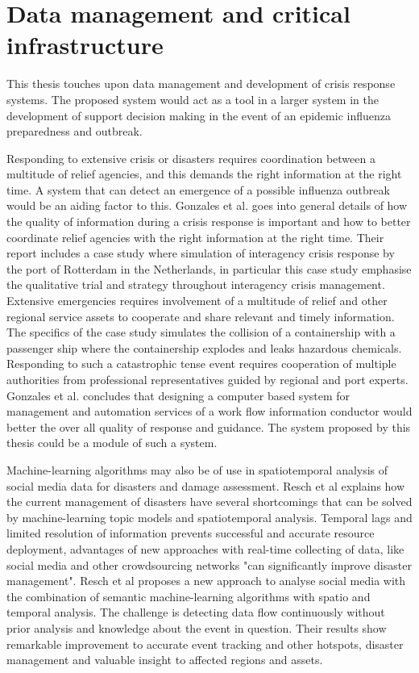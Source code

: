 \section{Data management and critical infrastructure}
This thesis touches upon data management and development of crisis response systems. The proposed system would act as a tool in a larger system in the development of support decision making in the event of an epidemic influenza preparedness and outbreak. 

Responding to extensive crisis or disasters requires coordination between a multitude of relief agencies, and this demands the right information at the right time. A system that can detect an emergence of a possible influenza outbreak would be an aiding factor to this. Gonzales et al. \cite{gonzalez2009framework} goes into general details of how the quality of information during a crisis response is important and how to better coordinate relief agencies with the right information at the right time. Their report includes a case study where simulation of interagency crisis response by the port of Rotterdam in the Netherlands, in particular this case study emphasise the qualitative trial and strategy throughout interagency crisis management. Extensive emergencies requires involvement of a multitude of relief and other regional service assets to cooperate and share relevant and timely information. The specifics of the case study simulates the collision of a containership with a passenger ship where the containership explodes and leaks hazardous chemicals. Responding to such a catastrophic tense event requires cooperation of multiple authorities from professional representatives guided by regional and port experts. Gonzales et al. concludes that designing a computer based system for management and automation services of a work flow information conductor would better the over all quality of response and guidance. The system proposed by this thesis could be a module of such a system. 

Machine-learning algorithms may also be of use in spatiotemporal analysis of social media data for disasters and damage assessment. Resch et al \cite{resch2018combining} explains how the current management of disasters have several shortcomings that can be solved by machine-learning topic models and spatiotemporal analysis. Temporal lags and limited resolution of information prevents successful and accurate resource deployment, advantages of new approaches with real-time collecting of data, like social media and other crowdsourcing networks "can significantly improve disaster management". Resch et al proposes a new approach to analyse social media with the combination of semantic machine-learning algorithms with spatio and temporal analysis. The challenge is detecting data flow continuously without prior analysis and knowledge about the event in question. Their results show remarkable improvement to accurate event tracking and other hotspots, disaster management and valuable insight to affected regions and assets.

